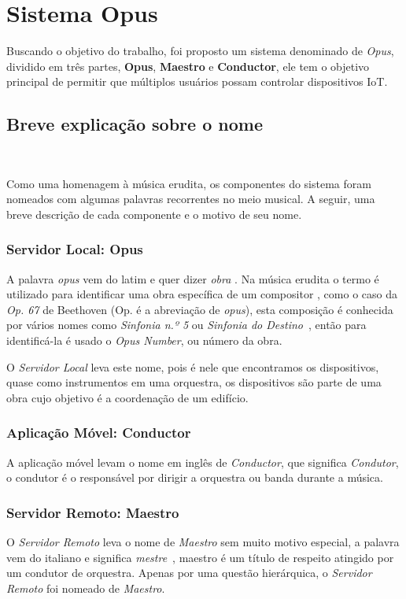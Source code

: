 \chapter{Sistema Opus}

Buscando o objetivo do trabalho, foi proposto um sistema denominado de \emph{Opus}, dividido em três partes, 
\textbf{Opus}, \textbf{Maestro} e \textbf{Conductor}, ele tem o objetivo principal de permitir que múltiplos usuários
possam controlar dispositivos IoT.

\section{Breve explicação sobre o nome}
~\label{sec:nomeando-componentes}

Como uma homenagem à música erudita, os componentes do sistema foram nomeados
com algumas palavras recorrentes no meio musical. A seguir, uma breve descrição
de cada componente e o motivo de seu nome.

\subsection{Servidor Local: \textbf{Opus}}
A palavra \emph{opus} vem do latim e quer dizer \emph{obra} \cite{opuslatin}. Na música
erudita o termo é utilizado para identificar uma obra específica de um compositor \cite{opusnumber}, 
como o caso da \emph{Op. 67} de Beethoven (Op. é a abreviação de \emph{opus}), esta
composição é conhecida por vários nomes como \emph{Sinfonia n.º 5} ou 
\emph{Sinfonia do Destino}~\cite{beethoven1}, então para identificá-la é usado o \emph{Opus Number},
ou número da obra.

O \emph{Servidor Local} leva este nome, pois é nele que encontramos os dispositivos,
quase como instrumentos em uma orquestra, os dispositivos são parte de uma obra cujo objetivo é a coordenação de um edifício.

\subsection{Aplicação Móvel: \textbf{Conductor}}
A aplicação móvel levam o nome em inglês de \emph{Conductor}, que significa
\emph{Condutor}, o condutor é o responsável por dirigir a orquestra ou banda durante
a música.

\subsection{Servidor Remoto: \textbf{Maestro}}
O \emph{Servidor Remoto} leva o nome de \emph{Maestro} sem muito motivo especial,
a palavra vem do italiano e significa \emph{mestre}~\cite{maestro-cambridge}, maestro é um título de respeito 
atingido por um condutor de orquestra. Apenas por uma questão hierárquica,
o \emph{Servidor Remoto} foi nomeado de \emph{Maestro}.

